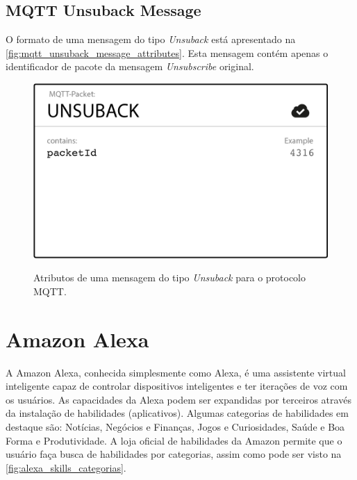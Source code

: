 \subsection{MQTT Unsuback Message}\label{subsection:mqtt_unsuback_message}

O formato de uma mensagem do tipo \textit{Unsuback} está apresentado na \autoref{fig:mqtt_unsuback_message_attributes}. Esta mensagem contém apenas o identificador de pacote da mensagem \textit{Unsubscribe} original.

\begin{figure}[htbp]
	\centering
	\caption{Atributos de uma mensagem do tipo \textit{Unsuback} para o protocolo MQTT.}
	\includegraphics[scale=0.5]{Imagens/mqtt_unsuback_message_attributes.png}
	\label{fig:mqtt_unsuback_message_attributes}
\end{figure}

\section{Amazon Alexa}\label{section:amazon_alexa}

A Amazon Alexa, conhecida simplesmente como Alexa, é uma assistente virtual inteligente capaz de controlar dispositivos inteligentes e ter iterações de voz com os usuários. As capacidades da Alexa podem ser expandidas por terceiros através da instalação de habilidades (aplicativos). Algumas categorias de habilidades em destaque são: Notícias, Negócios e Finanças, Jogos e Curiosidades, Saúde e Boa Forma e Produtividade. A loja oficial de habilidades da Amazon permite que o usuário faça busca de habilidades por categorias, assim como pode ser visto na \autoref{fig:alexa_skills_categorias}.

